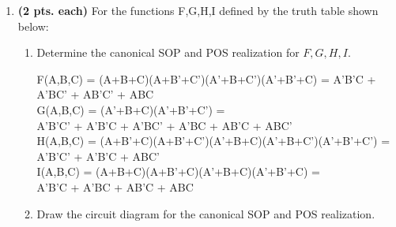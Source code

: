 \begin{enumerate}
	\begin{solution}{ Skipped, a glitch is created for sure.}\end{solution}

\item {\bf (2 pts. each)} For the functions F,G,H,I defined by the 
truth table shown below:
\begin{enumerate}
	\item Determine the canonical SOP and POS realization for $F,G,H,I$.

	\begin{solution}{
F(A,B,C) = (A+B+C)(A+B'+C')(A'+B+C')(A'+B'+C)  =
A'B'C + A'BC' + AB'C' + ABC \\

G(A,B,C) = (A'+B+C)(A'+B'+C') = \\
A'B'C' + A'B'C + A'BC' + A'BC + AB'C + ABC'  \\

H(A,B,C) = (A+B'+C)(A+B'+C')(A'+B+C)(A'+B+C')(A'+B'+C') =\\
A'B'C' + A'B'C + ABC' \\

I(A,B,C) = (A+B+C)(A+B'+C)(A'+B+C)(A'+B'+C) =\\
A'B'C + A'BC + AB'C + ABC \\
}\end{solution}

	\item Draw the circuit diagram for the canonical SOP and POS 
		realization.


\end{enumerate}
\end{enumerate}
